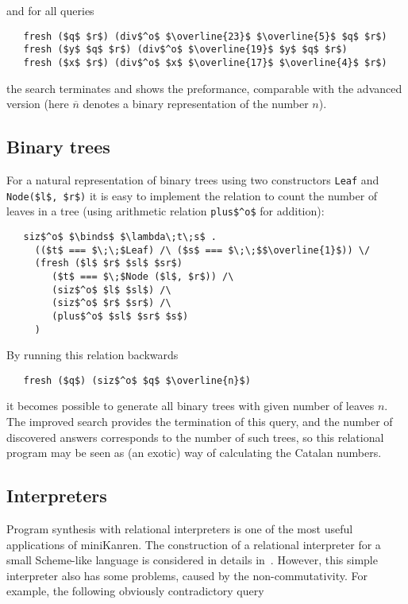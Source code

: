 \noindent and for all queries

\begin{lstlisting}
   fresh ($q$ $r$) (div$^o$ $\overline{23}$ $\overline{5}$ $q$ $r$)
   fresh ($y$ $q$ $r$) (div$^o$ $\overline{19}$ $y$ $q$ $r$)
   fresh ($x$ $r$) (div$^o$ $x$ $\overline{17}$ $\overline{4}$ $r$)
\end{lstlisting}

\noindent the search terminates and shows the preformance, comparable with the advanced version 
(here $\overline{n}$ denotes a binary representation of the number $n$).

\subsection{Binary trees}

For a natural representation of binary trees using two constructors \lstinline|Leaf| and 
\lstinline|Node($l$, $r$)| it is easy to implement the relation to count the number of 
leaves in a tree (using arithmetic relation \lstinline|plus$^o$| for addition):

\begin{lstlisting}
   siz$^o$ $\binds$ $\lambda\;t\;s$ .
     (($t$ === $\;\;$Leaf) /\ ($s$ === $\;\;$$\overline{1}$)) \/
     (fresh ($l$ $r$ $sl$ $sr$)
        ($t$ === $\;$Node ($l$, $r$)) /\
        (siz$^o$ $l$ $sl$) /\
        (siz$^o$ $r$ $sr$) /\
        (plus$^o$ $sl$ $sr$ $s$)
     )
\end{lstlisting}

By running this relation backwards

\begin{lstlisting}
   fresh ($q$) (siz$^o$ $q$ $\overline{n}$)
\end{lstlisting}

\noindent it becomes possible to generate all binary trees with given number of leaves $n$. 
The improved search provides the termination of this query, and the number of discovered 
answers corresponds to the number of such trees, so this relational program may be seen 
as (an exotic) way of calculating the Catalan numbers.

\subsection{Interpreters}

Program synthesis with relational interpreters is one of the most useful applications of miniKanren. 
The construction of a relational interpreter for a small Scheme-like language is considered 
in details in~\cite{Untagged}. However, this simple interpreter also has some problems, caused by 
the non-commutativity. For example, the following obviously contradictory query

